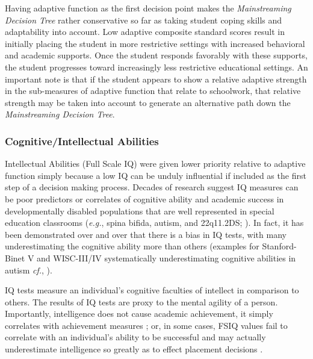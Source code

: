 \documentclass[twoside]{article}
\begin{document}
Having adaptive function as the first decision point makes the \textit{Mainstreaming Decision Tree} rather conservative so far as taking student coping skills and adaptability into account. Low adaptive composite standard scores result in initially placing the student in more restrictive settings with increased behavioral and academic supports. Once the student responds favorably with these supports, the student progresses toward increasingly less restrictive educational settings. An important note is that if the student appears to show a relative adaptive strength in the sub-measures of adaptive function that relate to schoolwork, that relative strength may be taken into account to generate an alternative path down the \textit{Mainstreaming Decision Tree}. 

\subsubsection{Cognitive/Intellectual Abilities}
Intellectual Abilities (Full Scale IQ) were given lower priority relative to adaptive function simply because a low IQ can be unduly influential if included as the first step of a decision making process. Decades of research suggest IQ measures can be poor predictors or correlates of cognitive ability and academic success in developmentally disabled populations that are well represented in special education classrooms (\textit{e.g.}, spina bifida, autism, and 22q11.2DS; \cite{biswas2016cognitive,dennis2009iq,popa2014atypical,nader2014does}). In fact, it has been demonstrated over and over that there is a bias in IQ tests, with many underestimating the cognitive ability more than others (examples for Stanford-Binet V and WISC-III/IV systematically underestimating cognitive abilities in autism \textit{cf.}, \cite{dawson2007,barbeau2013level,courchesne2015autistic,nader2016does}).

IQ tests measure an individual's cognitive faculties of intellect in comparison to others. The results of IQ tests are proxy to the mental agility of a person. Importantly, intelligence does not cause academic achievement, it simply correlates with achievement measures \parencite{konold1997factor,wechsler2008wechsler}; or, in some cases, FSIQ values fail to correlate with an individual's ability to be successful and may actually underestimate intelligence so greatly as to effect placement decisions \parencite{biswas2016cognitive,dennis2009iq,popa2014atypical,nader2014does}.
\end{document}
